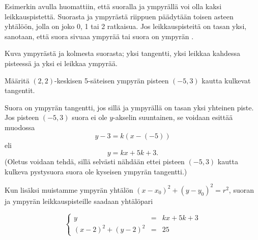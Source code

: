 Esimerkin avulla huomattiin, että suoralla ja ympyrällä voi olla kaksi leikkauspistettä. Suorasta ja ympyrästä riippuen päädytään toisen asteen yhtälöön, jolla on joko 0, 1 tai 2 ratkaisua. Jos leikkauspisteitä on tasan yksi, sanotaan, että suora sivuaa ympyrää tai suora on ympyrän .

Kuva ympyrästä ja kolmesta suorasta; yksi tangentti, yksi leikkaa kahdessa pisteessä ja yksi ei leikkaa ympyrää.


\begin{esimerkki}

Määritä $(2, 2)$-keskisen 5-säteisen ympyrän pisteen $(-5, 3)$ kautta kulkevat tangentit.

\begin{esimratk}
Suora on ympyrän tangentti, jos sillä ja ympyrällä on tasan yksi yhteinen piste. Jos pisteen $(-5, 3)$ suora ei ole $y$-akselin suuntainen, se voidaan esittää muodossa
\[
y-3 = k(x-(-5))
\]
eli
\[    
y = kx+5k+3.
\]
(Oletus voidaan tehdä, sillä selvästi nähdään ettei pisteen $(-5, 3)$ kautta kulkeva pystysuora suora ole kyseisen ympyrän tangentti.)

Kun lisäksi muistamme ympyrän yhtälön $(x-x_0)^2+(y-y_0)^2 = r^2$, suoran ja ympyrän leikkauspisteille saadaan yhtälöpari

\[
\left\{    
    \begin{array}{rcl}
        y &=& kx+5k+3 \\
        (x-2)^2+(y-2)^2 &=& 25 
\end{array}
    \right.
\]
    

\end{esimratk}
\end{esimerkki}
